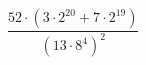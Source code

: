 \begin{ex}[type=calculate]
	\begin{condition}
		\( \dfrac{52\cdot(3\cdot2^{20}+7\cdot2^{19})}{(13\cdot8^4)^2} \)
	\end{condition}
\end{ex}